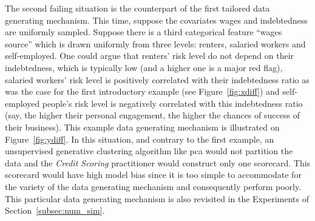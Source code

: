 The second failing situation is the counterpart of the first tailored data generating mechanism. This time, suppose the covariates wages and indebtedness are uniformly sampled. Suppose there is a third categorical feature ``wages source'' which is drawn uniformly from three levels: renters, salaried workers and self-employed. One could argue that renters' risk level do not depend on their indebtedness, which is typically low (and a higher one is a major red flag), salaried workers' risk level is positively correlated with their indebtedness ratio as was the case for the first introductory example (see Figure~\ref{fig:xdiff}) and self-employed people's risk level is negatively correlated with this indebtedness ratio (say, the higher their personal engagement, the higher the chances of success of their business). This example data generating mechanism is illustrated on Figure~\ref{fig:ydiff}. In this situation, and contrary to the first example, an unsupervised generative clustering algorithm like \gls{pca} would not partition the data and the \textit{Credit Scoring} practitioner would construct only one scorecard. This scorecard would have high model bias since it is too simple to accommodate for the variety of the data generating mechanism and consequently perform poorly. This particular data generating mechanism is also revisited in the Experiments of Section~\ref{subsec:num_sim}.


